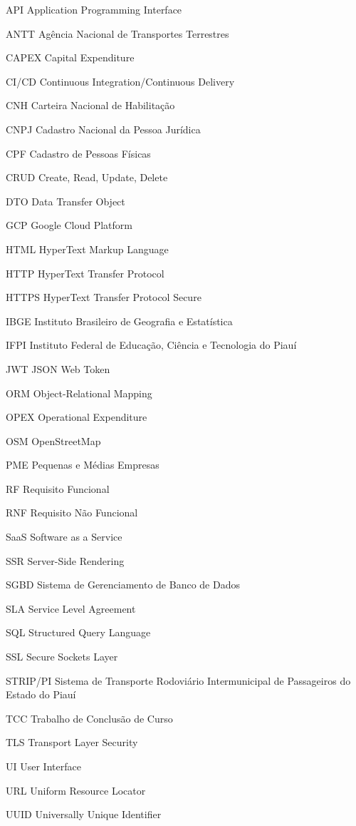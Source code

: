 \begin{siglas}
  \item[API] Application Programming Interface
  \item[ANTT] Agência Nacional de Transportes Terrestres
  \item[CAPEX] Capital Expenditure
  \item[CI/CD] Continuous Integration/Continuous Delivery
  \item[CNH] Carteira Nacional de Habilitação
  \item[CNPJ] Cadastro Nacional da Pessoa Jurídica
  \item[CPF] Cadastro de Pessoas Físicas
  \item[CRUD] Create, Read, Update, Delete
  \item[DTO] Data Transfer Object
  \item[GCP] Google Cloud Platform
  \item[HTML] HyperText Markup Language
  \item[HTTP] HyperText Transfer Protocol
  \item[HTTPS] HyperText Transfer Protocol Secure
  \item[IBGE] Instituto Brasileiro de Geografia e Estatística
  \item[IFPI] Instituto Federal de Educação, Ciência e Tecnologia do Piauí
  \item[JWT] JSON Web Token
  \item[ORM] Object-Relational Mapping
  \item[OPEX] Operational Expenditure
  \item[OSM] OpenStreetMap
  \item[PME] Pequenas e Médias Empresas
  \item[RF] Requisito Funcional
  \item[RNF] Requisito Não Funcional
  \item[SaaS] Software as a Service
  \item[SSR] Server-Side Rendering
  \item[SGBD] Sistema de Gerenciamento de Banco de Dados
  \item[SLA] Service Level Agreement
  \item[SQL] Structured Query Language
  \item[SSL] Secure Sockets Layer
  \item[STRIP/PI] Sistema de Transporte Rodoviário Intermunicipal de Passageiros do Estado do Piauí
  \item[TCC] Trabalho de Conclusão de Curso
  \item[TLS] Transport Layer Security
  \item[UI] User Interface
  \item[URL] Uniform Resource Locator
  \item[UUID] Universally Unique Identifier
\end{siglas}